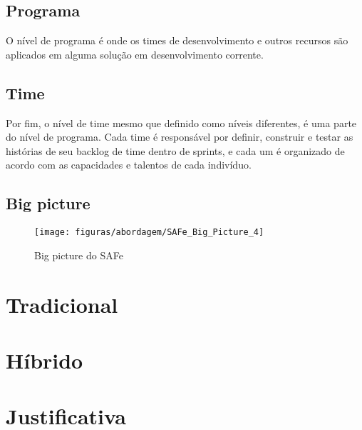 \subsection{Programa}
O nível de programa é onde os times de desenvolvimento e outros recursos são aplicados em alguma solução em desenvolvimento corrente.

\subsection{Time}
Por fim, o nível de time mesmo que definido como níveis diferentes, é uma parte do nível de programa. Cada time é responsável por definir, construir e testar as histórias de seu backlog de time dentro de sprints, e cada um é organizado de acordo com as capacidades e talentos de cada indivíduo.

\subsection{Big picture}
\begin{figure}[!htpb]
	\centering
	\texttt{[image: figuras/abordagem/SAFe\_Big\_Picture\_4]}
	\caption{Big picture do SAFe}
\end{figure}

\section{Tradicional}

\section{Híbrido}

\section{Justificativa}
